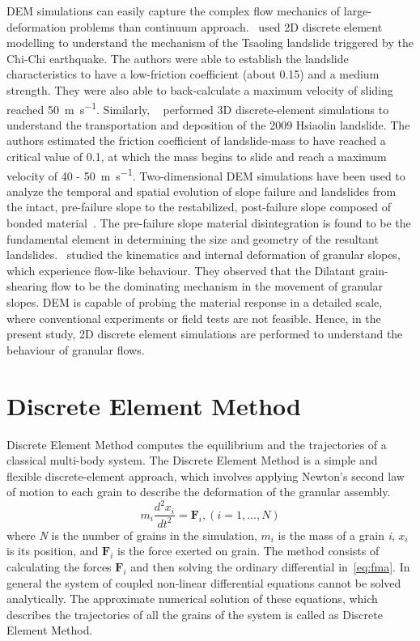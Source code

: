 DEM simulations can easily capture the complex flow mechanics of 
large-deformation problems than continuum approach.~\cite{Tang2009} used 2D 
discrete element modelling to understand the mechanism of the Tsaoling 
landslide triggered by the Chi-Chi earthquake. The authors were able to 
establish the landslide characteristics to have a low-friction coefficient 
(about 0.15) and a medium strength. They were also able to back-calculate a 
maximum velocity of sliding reached 50~\si{\m\per\s}. Similarly, 
~\cite{Tang2013} performed 3D discrete-element simulations to understand the 
transportation and deposition of the 2009 Hsiaolin landslide. The authors 
estimated the friction coefficient of landslide-mass to have reached a critical 
value of 0.1, at which the mass begins to slide and reach a maximum velocity of 
40 - 50~\si{\m\per\s}. Two-dimensional DEM simulations have been used to 
analyze the temporal and spatial evolution of slope failure and landslides from 
the intact, pre-failure slope to the restabilized, post-failure slope composed 
of bonded material~\citep{Katz2014}. The pre-failure slope material 
disintegration is found to be the fundamental element in determining the size 
and geometry of the resultant landslides.~\citet{Liu2013} studied the 
kinematics and internal deformation of granular slopes, which experience 
flow-like behaviour. They observed that the Dilatant grain-shearing flow to be 
the dominating mechanism in the movement of granular slopes. DEM is capable of 
probing the material response in a detailed scale, where conventional 
experiments or field tests are not feasible. Hence, in the present study, 2D 
discrete element simulations are performed to understand the behaviour of 
granular flows. 

 

\section{Discrete Element Method}

Discrete Element Method computes the equilibrium and the trajectories of a 
classical multi-body system. The Discrete Element Method is a simple and 
flexible discrete-element approach, which involves applying Newton's second law 
of motion to each grain to describe the deformation of the granular assembly. 
% 
\begin{equation} 
{m}_{i}\frac{{{d}^{2}}{{x}_{i}}}{d{{t}^{2}}} = {{\mathbf{F}}_{i}}, 
(i=1,...,N )
\label{eq:fma}
\end{equation}
%
where \textit{N} is the number of grains in the simulation, $m_{\mathit{i}}$ 
is the mass of a grain \textit{i}, $x_{\mathit{i}}$ is its position, and 
$\mathbf{F}_{\mathit{i}}$ is the force exerted on grain. The method consists of 
calculating the forces $\mathbf{F}_{\mathit{i}}$ and then solving 
the ordinary differential in~\cref{eq:fma}. In general the system of coupled 
non-linear differential equations cannot be solved analytically. The 
approximate numerical solution of these equations, which describes the 
trajectories of all the grains of the system is called as Discrete Element 
Method.

